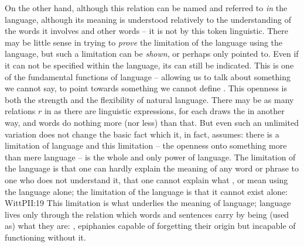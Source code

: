 On the other hand, although this relation  can be named and
referred to {\em in} the language, although its meaning is understood relatively
to the understanding of the words it involves and other words -- it is not by
this token linguistic.  There may be little sense in trying to {\em prove} the
limitation of the language using the language, but such a limitation can be {\em
  shown}, or perhaps only pointed to. Even if it can not be 
specified within the language, its  can still be 
indicated. This is one of the fundamental functions of language -- allowing us
to talk about something we cannot say, to point towards something we cannot
define . This openness is both the strength and the flexibility of
natural language.  There may be as many relations $r$ in  as
there are linguistic expressions, for each draws the  in
another way, and words do nothing more (nor less) than that. But even such an
unlimited variation does not change the basic fact which it, in fact, assumes:
there is a limitation of language and this limitation -- the openness onto
something more than mere language -- is the whole and only power of
language. The limitation of the
language is that one can hardly explain the meaning of any word or phrase to one
who does not understand it, that one cannot explain what , 
or  mean using the language alone; the limitation of the language is
that it cannot exist alone: \citet{to imagine a language means to imagine a form
  of life.}{WittPI}{I:19} This limitation is what underlies the meaning of
language; language lives only through the relation which words and sentences
carry by being (used as) what they are: , epiphanies
capable of forgetting their origin but incapable of functioning
without it.




